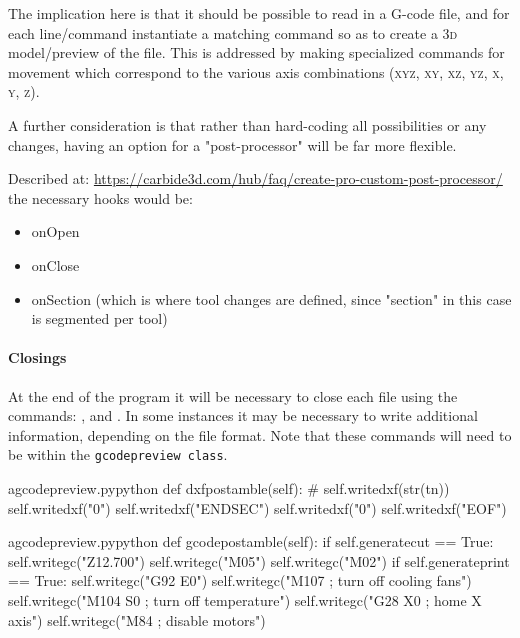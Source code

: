 \documentclass{ltxdoc}
\begin{document}
The implication here is that it should be possible to read in a G-code file, and for each line/\allowbreak command instantiate a matching command so as to create a \textsc{3d} model/preview  of the file. This is addressed by making specialized commands for movement which correspond to the various axis combinations (\textsc{xyz}, \textsc{xy}, \textsc{xz}, \textsc{yz}, \textsc{x}, \textsc{y}, \textsc{z}).

A further consideration is that rather than hard-coding all possibilities or any changes, having an option for a "post-processor" will be far more flexible.

Described at: \url{https://carbide3d.com/hub/faq/create-pro-custom-post-processor/} the necessary hooks would be:

\begin{itemize}
\item onOpen
\item onClose
\item onSection (which is where tool changes are defined, since "section" in this case is segmented per tool)
\end{itemize}

\paragraph{Closings}

At the end of the program it will be necessary to close each file using the commands: 
, and
. %
In some instances it may be necessary to write additional information, depending on the file format. Note that these commands will need to be within the \verb|gcodepreview class|.
 
\lstset{firstnumber=\thegcpy}
\begin{writecode}{a}{gcodepreview.py}{python}
    def dxfpostamble(self):
#        self.writedxf(str(tn))
        self.writedxf("0")
        self.writedxf("ENDSEC")
        self.writedxf("0")
        self.writedxf("EOF")
        
\end{writecode}
\addtocounter{gcpy}{7}

\lstset{firstnumber=\thegcpy}
\begin{writecode}{a}{gcodepreview.py}{python}
    def gcodepostamble(self):
        if self.generatecut == True:
            self.writegc("Z12.700")
            self.writegc("M05")
            self.writegc("M02")
        if self.generateprint == True:
            self.writegc("G92 E0")
            self.writegc("M107    ; turn off cooling fans")
            self.writegc("M104 S0 ; turn off temperature")
            self.writegc("G28 X0  ; home X axis")
            self.writegc("M84     ; disable motors")

\end{writecode}
\addtocounter{gcpy}{12}
\end{document}
